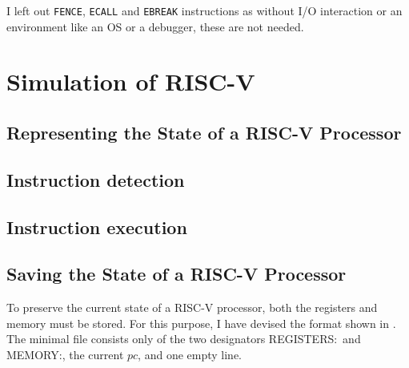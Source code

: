 I left out \texttt{FENCE}, \texttt{ECALL} and \texttt{EBREAK} instructions as
without I/O interaction or an environment like an OS or a debugger, these are
not needed.

\section{Simulation of RISC-V}\label{sec:simulation}
\cite{repoSim}

\subsection{Representing the State of a RISC-V Processor}
\subsection{Instruction detection}
\subsection{Instruction execution}

\subsection{Saving the State of a RISC-V Processor}\label{sub:statefile}
To preserve the current state of a RISC-V processor, both the registers and
memory must be stored. For this purpose, I have devised the format shown in
. The minimal file consists only of the two designators
\dq REGISTERS:\dq\ and \dq MEMORY:\dq, the current $pc$, and one empty line.

